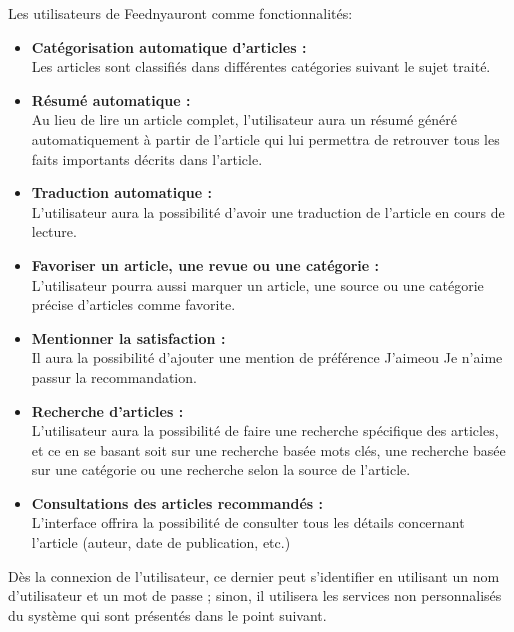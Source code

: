 \begin{enumerate}[leftmargin=*]
    Les utilisateurs de \textquotedbl Feedny\textquotedbl auront comme fonctionnalités:  
    \begin{itemize}
        \item \textbf{Catégorisation automatique d'articles :}\\
        Les articles sont classifiés dans différentes catégories suivant le sujet traité.
        \item \textbf{Résumé automatique :}\\
        Au lieu de lire un article complet, l'utilisateur aura un résumé généré automatiquement à partir de l'article qui lui permettra de retrouver tous les faits importants décrits dans l'article.
        \item \textbf{Traduction automatique :}\\
        L'utilisateur aura la possibilité d'avoir une traduction de l'article en cours de lecture.
        \item \textbf{Favoriser un article, une revue ou une catégorie :}\\
        L'utilisateur pourra aussi marquer un article, une source ou une catégorie précise d'articles comme favorite.
        \item \textbf{Mentionner la satisfaction :}\\
        Il aura la possibilité d'ajouter une mention de préférence \textquotedbl J'aime\textquotedbl ou \textquotedbl Je n'aime pas\textquotedbl sur la recommandation.
        \item \textbf{Recherche d'articles :}\\
        L'utilisateur aura la possibilité de faire une recherche spécifique des articles, et ce en se basant soit sur une recherche basée mots clés, une recherche basée sur une catégorie ou une recherche selon la source de l'article. 
        \item \textbf{Consultations des articles recommandés :}\\
        L'interface offrira la possibilité de consulter tous les détails concernant l'article (auteur, date de publication, etc.) 
    \end{itemize}
    Dès la connexion de l'utilisateur, ce dernier peut s'identifier en utilisant un nom d'utilisateur et un mot de passe ; sinon, il utilisera les services non personnalisés du système qui sont présentés dans le point suivant.\\


\end{enumerate}
